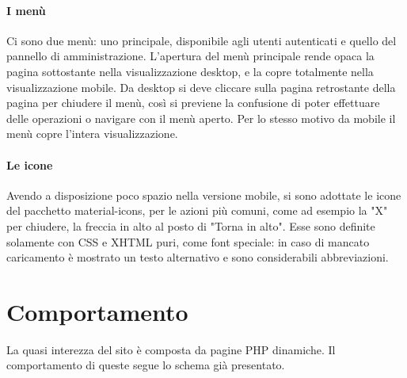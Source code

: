 \documentclass[12pt, a4paper]{article}
\begin{document}
    \paragraph{I menù} Ci sono due menù: uno principale, disponibile agli utenti autenticati e quello del pannello di amministrazione. L'apertura del menù principale rende opaca la pagina sottostante nella visualizzazione desktop, e la copre totalmente nella visualizzazione mobile. Da desktop si deve cliccare sulla pagina retrostante della pagina per chiudere il menù, così si previene la confusione di poter effettuare delle operazioni o navigare con il menù aperto. Per lo stesso motivo da mobile il menù copre l'intera visualizzazione.

    \paragraph{Le icone} Avendo a disposizione poco spazio nella versione mobile, si sono adottate le icone del pacchetto material-icons, per le azioni più comuni, come ad esempio la "X" per chiudere, la freccia in alto al posto di "Torna in alto". Esse sono definite solamente con CSS e XHTML puri, come font speciale: in caso di mancato caricamento è mostrato un testo alternativo e sono considerabili abbreviazioni.


    \section{Comportamento}
    La quasi interezza del sito è composta da pagine PHP dinamiche. Il comportamento di queste segue lo schema già presentato.
\end{document}
